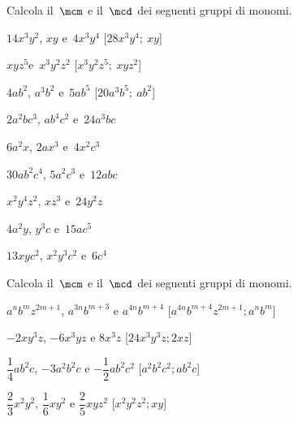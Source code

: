 \begin{esercizio}[\Ast]
 \label{ese:9.45}
Calcola il~\(\mcm\) e il~\(\mcd\) dei seguenti gruppi di monomi.
\begin{enumeratea}
 \item \(14x^{3}y^{2}\), \(xy\) e~\(4x^{3}y^{4}\) \hfill[\(28x^{3}y^{4};~xy\)]
 \item \(xyz^{5}\)e~\(x^{3}y^{2}z^{2}\) \hfill[\(x^{3}y^{2}z^{5};~xyz^{2}\)]
 \item \(4ab^{2}\), \(a^{3}b^{2}\) e~\(5ab^{5}\) \hfill[\(20a^{3}b^{5};~ab^{2}\)]
% 
% 
 \item \(2a^{2}bc^{3}\), \(ab^{4}c^{2}\) e~\(24a^{3}bc\)
 \item \(6a^{2}x\), \(2ax^{3}\) e~\(4x^{2}c^{3}\)
 \item \(30ab^{2}c^{4}\), \(5a^{2}c^{3}\) e~\(12abc\)
% 
% 
 \item \(x^{2}y^{4}z^{2}\), \(xz^{3}\) e~\(24y^{2}z\)
 \item \(4a^{2}y\), \(y^{3}c\) e~\(15ac^{5}\)
 \item \(13xyc^{2}\), \(x^{2}y^{3}c^{2}\) e~\(6c^{4}\)
\end{enumeratea}
\end{esercizio}

\begin{esercizio}[\Ast]
 \label{ese:9.48}
Calcola il~\(\mcm\) e il~\(\mcd\) dei seguenti gruppi di monomi.

\begin{enumeratea}
 \item \(a^{n}b^{m}z^{2m+1}\), \quad \(a^{3n}b^{m+3}\) \quad e \quad 
\(a^{4n}b^{m+4}\) 
 \hfill[\(a^{4n}b^{m+4}z^{2m+1}; a^{n}b^{m}\)]
 \item \(-2xy^{3}z\), \quad \(-6x^{3}yz\) \quad e \quad \(8x^{3}z\) 
 \hfill[\(24x^{3}y^{3}z; 2xz\)]
 \item \(\dfrac{1}{4}ab^{2}c\), \quad \(-3a^{2}b^{2}c\) \quad e \quad 
\(-{\dfrac{1}{2}}ab^{2}c^{2}\) 
 \hfill[\(a^{2}b^{2}c^{2};ab^{2}c\)]
 \item \(\dfrac{2}{3}x^{2}y^{2}\), \quad \(\dfrac{1}{6}xy^{2}\) \quad e \quad 
\(\dfrac{2}{5}xyz^{2}\) 
 \hfill[\(x^{2}y^{2}z^{2};xy\)]
\end{enumeratea}
\end{esercizio}

